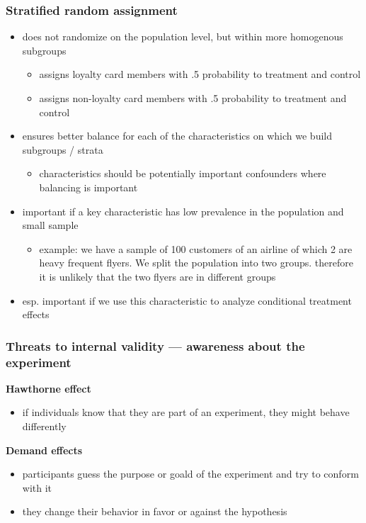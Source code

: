 \documentclass[10pt]{article}
\begin{document}
\subsubsection{Stratified random assignment}
\begin{itemize}
    \item does not randomize on the population level, but within more homogenous subgroups
    \begin{itemize}
        \item assigns loyalty card members with .5 probability to treatment and control
        \item assigns non-loyalty card members with .5 probability to treatment and control
    \end{itemize}
    \item ensures better balance for each of the characteristics on which we build subgroups / strata 
    \begin{itemize}
        \item characteristics should be potentially important confounders where balancing is important
    \end{itemize}
    \item important if a key characteristic has low prevalence in the population and small sample
    \begin{itemize}
        \item example: we have a sample of 100 customers of an airline of which 2 are heavy frequent flyers. We split the population into two groups. therefore it is unlikely that the two flyers are in different groups 
    \end{itemize}
    \item esp. important if we use this characteristic to analyze conditional treatment effects 
\end{itemize}
\subsubsection{Threats to internal validity --- awareness about the experiment}
\textbf{Hawthorne effect}
\begin{itemize}
    \item if individuals know that they are part of an experiment, they might behave differently
\end{itemize}
\textbf{Demand effects}
\begin{itemize}
    \item participants guess the purpose or goald of the experiment and try to conform with it 
    \item they change their behavior in favor or against the hypothesis
\end{itemize}
\end{document}
